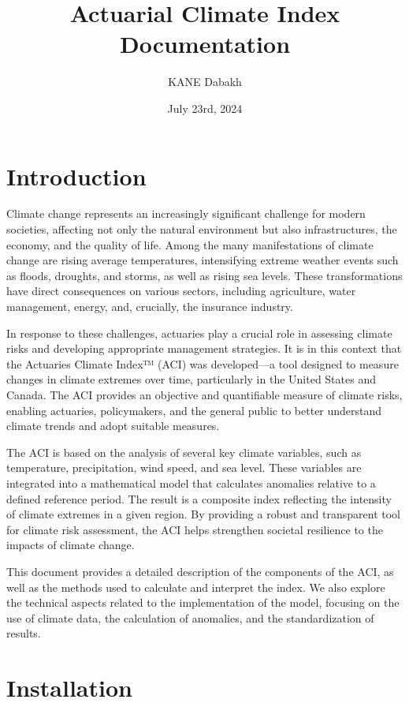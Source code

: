 \documentclass[a4paper,12pt]{article}
\title{Actuarial Climate Index Documentation}
\author{KANE Dabakh}
\date{July 23rd, 2024}
\begin{document}
\maketitle

\tableofcontents
\newpage

\section{Introduction}
\label{sec:introduction}

Climate change represents an increasingly significant challenge for modern societies, affecting not only the natural environment but also infrastructures, the economy, and the quality of life. Among the many manifestations of climate change are rising average temperatures, intensifying extreme weather events such as floods, droughts, and storms, as well as rising sea levels. These transformations have direct consequences on various sectors, including agriculture, water management, energy, and, crucially, the insurance industry.

In response to these challenges, actuaries play a crucial role in assessing climate risks and developing appropriate management strategies. It is in this context that the Actuaries Climate Index™ (ACI) was developed—a tool designed to measure changes in climate extremes over time, particularly in the United States and Canada. The ACI provides an objective and quantifiable measure of climate risks, enabling actuaries, policymakers, and the general public to better understand climate trends and adopt suitable measures.

The ACI is based on the analysis of several key climate variables, such as temperature, precipitation, wind speed, and sea level. These variables are integrated into a mathematical model that calculates anomalies relative to a defined reference period. The result is a composite index reflecting the intensity of climate extremes in a given region. By providing a robust and transparent tool for climate risk assessment, the ACI helps strengthen societal resilience to the impacts of climate change.

This document provides a detailed description of the components of the ACI, as well as the methods used to calculate and interpret the index. We also explore the technical aspects related to the implementation of the model, focusing on the use of climate data, the calculation of anomalies, and the standardization of results.

\section{Installation}
\label{sec:installation}
\end{document}
